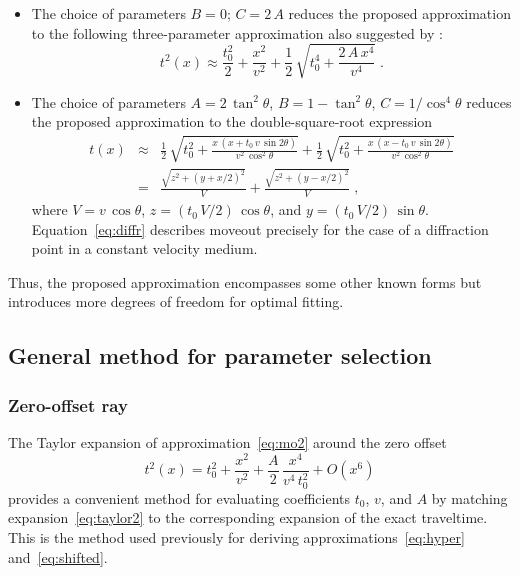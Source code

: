 \begin{itemize}
\item The choice of parameters $B=0$; $C=2\,A$ reduces the proposed approximation to the following 
  three-parameter approximation also suggested by \cite{blias}:
  \begin{equation}
    \label{eq:blias2}
    t^2(x) \approx \frac{t_0^2}{2} + \frac{x^2}{v^2} + \frac{1}{2}\,\sqrt{t_0^4 + \frac{2\,A\,x^4}{v^4}}\;.
  \end{equation}
  
\item The choice of parameters $A = 2\,\tan^2{\theta}$,
  $B=1-\tan^2{\theta}$, $C=1/\cos^4{\theta}$ reduces the proposed
  approximation to the double-square-root expression 
  \begin{eqnarray}
    \nonumber
    t(x) & \approx & \frac{1}{2}\,
    \sqrt{t_0^2 + \frac{x\,(x+t_0\,v\,\sin{2\theta})}{v^2\,\cos^2{\theta}}} +
    \frac{1}{2}\,
    \sqrt{t_0^2 + \frac{x\,(x-t_0\,v\,\sin{2\theta})}{v^2\,\cos^2{\theta}}} \\
    & = & \frac{\sqrt{z^2 + (y+x/2)^2}}{V} + \frac{\sqrt{z^2 + (y-x/2)^2}}{V}\;,
    \label{eq:diffr}
  \end{eqnarray}
  where $V = v\,\cos{\theta}$, $z=(t_0\,V/2)\,\cos{\theta}$, and
  $y=(t_0\,V/2)\,\sin{\theta}$. Equation~\ref{eq:diffr} describes
  moveout precisely for the case of a diffraction point in a constant
  velocity medium.
\end{itemize}

Thus, the proposed approximation encompasses some other known forms but
introduces more degrees of freedom for optimal fitting.

\subsection{General method for parameter selection}
\subsubsection{Zero-offset ray}

The Taylor expansion of approximation~\ref{eq:mo2} around the zero offset
\begin{equation}
  \label{eq:taylor2}
  t^2(x) = t_0^2 + \frac{x^2}{v^2} + \frac{A}{2}\,\frac{x^4}{v^4\,t_0^2} + O(x^6)
\end{equation}
provides a convenient method for evaluating coefficients $t_0$, $v$,
and $A$ by matching expansion~\ref{eq:taylor2} to the corresponding
expansion of the exact traveltime. This is the method used previously
for deriving approximations~\ref{eq:hyper} and~\ref{eq:shifted}. 

